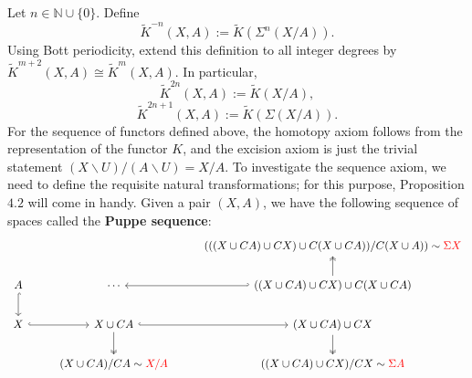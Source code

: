 \documentclass[11pt,a4paper]{article}
\begin{document}
Let $n \in \mathbb{N}\cup \{0\}$. Define
$$\widetilde{K}^{-n}(X, A):= \widetilde{K}(\Sigma^n(X/A)).$$
Using Bott periodicity, extend this definition to all integer degrees by $\widetilde K^{m+2}(X,A)\cong\widetilde K^m(X,A)$.
In particular,
$$\widetilde{K}^{2n}(X, A) := \widetilde{K}(X/A),$$
$$\widetilde{K}^{2n+1}(X, A) := \widetilde{K}(\Sigma(X/A)).$$
For the sequence of functors defined above, the homotopy axiom follows from the representation of the functor $K$, and the excision axiom is just the trivial statement $(X\backslash U)/(A\backslash U) = X/A$. To investigate the sequence axiom, we need to define the requisite natural transformations; for this purpose, Proposition $4.2$ will come in handy. Given a pair $(X, A)$, we have the following sequence of spaces called the \textbf{Puppe sequence}:
\[\begin{tikzcd}
	&& {(((X\cup CA)\cup CX)\cup C(X\cup CA))/C(X\cup A))\sim \color{red}{\Sigma} X} \\
	A & \cdots & {((X\cup CA)\cup CX)\cup C(X\cup CA)} \\
	X & {X\cup CA} & {(X\cup CA)\cup CX} \\
	& {(X\cup CA)/CA \sim \color{red}{X/A}} & {((X\cup CA)\cup CX)/CX \sim \color{red}{\Sigma A}}
	\arrow[hook, from=3-1, to=3-2]
	\arrow[hook, from=3-2, to=3-3]
	\arrow[two heads, from=3-2, to=4-2]
	\arrow[hook', from=2-3, to=2-2]
	\arrow[hook, from=2-1, to=3-1]
	\arrow[two heads, from=2-3, to=1-3]
	\arrow[two heads, from=3-3, to=4-3]
\end{tikzcd}\]

\end{document}
